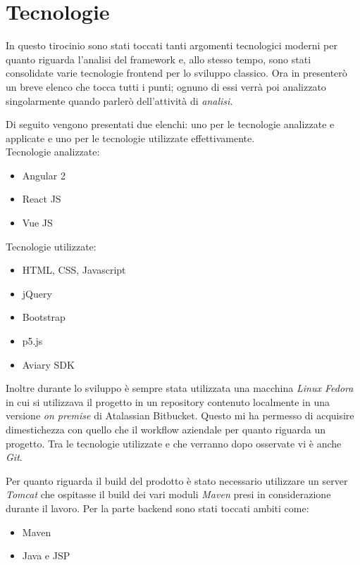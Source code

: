 \documentclass[a4paper]{article}
\begin{document}
\section{Tecnologie}
\label{sec:Tecnologie}
\par In questo tirocinio sono stati toccati tanti argomenti tecnologici moderni
per quanto riguarda l'analisi del framework e, allo stesso tempo, sono stati consolidate
varie tecnologie frontend per lo sviluppo classico. Ora in presenterò un breve elenco
che tocca tutti i punti; ognuno di essi verrà poi analizzato singolarmente quando
parlerò dell'attività di \emph{analisi}.\\
\par Di seguito vengono presentati due elenchi: uno per le tecnologie analizzate e applicate
e uno per le tecnologie utilizzate effettivamente.\\
Tecnologie analizzate:
\begin{itemize}
	\item Angular 2
	\item React JS
	\item Vue JS
\end{itemize}
Tecnologie utilizzate:
\begin{itemize}
	\item HTML, CSS, Javascript
	\item jQuery
	\item Bootstrap
	\item p5.js
	\item Aviary SDK
\end{itemize}
\par Inoltre durante lo sviluppo è sempre stata utilizzata una macchina \emph{Linux Fedora}
in cui si utilizzava il progetto in un repository contenuto localmente in una versione
\emph{on premise} di Atalassian Bitbucket. Questo mi ha permesso di acquisire dimestichezza
con quello che il workflow aziendale per quanto riguarda un progetto.
Tra le tecnologie utilizzate e che verranno dopo osservate vi è anche \emph{Git}.\\
\par Per quanto riguarda il build del prodotto è stato necessario utilizzare un server
\emph{Tomcat} che ospitasse il build dei vari moduli \emph{Maven} presi in considerazione
durante il lavoro.
Per la parte backend sono stati toccati ambiti come:
\begin{itemize}
	\item Maven
	\item Java e JSP
\end{itemize}
\newpage
\end{document}
